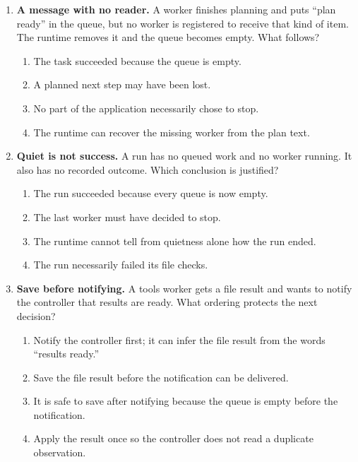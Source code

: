 \begin{enumerate}[start=41,itemsep=0.7\baselineskip]
\item\label{exercise:43} \begin{minipage}[t]{\linewidth}
\textbf{A message with no reader.} A worker finishes planning and puts ``plan ready'' in the queue, but no worker is registered to receive that kind of item. The runtime removes it and the queue becomes empty. What follows?
\begin{enumerate}[label=\textnormal{(\Alph*)},leftmargin=*,itemsep=0pt]
\item The task succeeded because the queue is empty.
\item A planned next step may have been lost.
\item No part of the application necessarily chose to stop.
\item The runtime can recover the missing worker from the plan text.
\end{enumerate}
\end{minipage}

\item\label{exercise:44} \begin{minipage}[t]{\linewidth}
\textbf{Quiet is not success.} A run has no queued work and no worker running. It also has no recorded outcome. Which conclusion is justified?
\begin{enumerate}[label=\textnormal{(\Alph*)},leftmargin=*,itemsep=0pt]
\item The run succeeded because every queue is now empty.
\item The last worker must have decided to stop.
\item The runtime cannot tell from quietness alone how the run ended.
\item The run necessarily failed its file checks.
\end{enumerate}
\end{minipage}

\item\label{exercise:45} \begin{minipage}[t]{\linewidth}
\textbf{Save before notifying.} A tools worker gets a file result and wants to notify the controller that results are ready. What ordering protects the next decision?
\begin{enumerate}[label=\textnormal{(\Alph*)},leftmargin=*,itemsep=0pt]
\item Notify the controller first; it can infer the file result from the words ``results ready.''
\item Save the file result before the notification can be delivered.
\item It is safe to save after notifying because the queue is empty before the notification.
\item Apply the result once so the controller does not read a duplicate observation.
\end{enumerate}
\end{minipage}


\end{enumerate}
